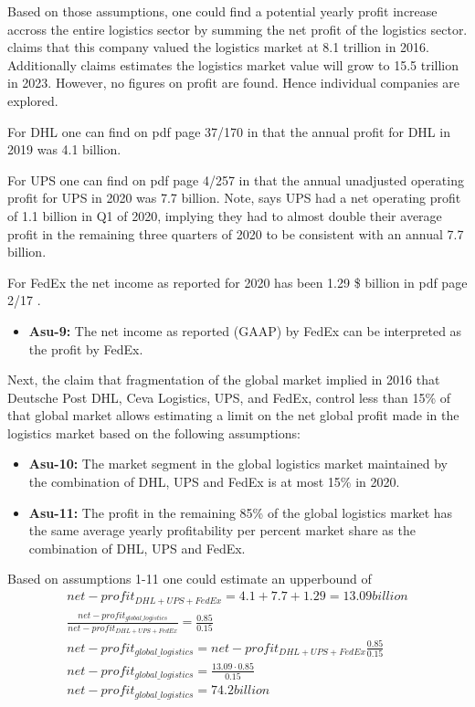 Based on those assumptions, one could find a potential yearly profit increase accross the entire logistics sector by summing the net profit of the logistics sector. \cite{cips} claims that this company \cite{transparency_market_research} valued the logistics market at 8.1 trillion in 2016. Additionally \cite{cips} claims \cite{transparency_market_research} estimates the logistics market value will grow to 15.5 trillion in 2023. However, no figures on profit are found. Hence individual companies are explored. 

For DHL one can find on pdf page 37/170 in \cite{dhl_2019_annual_report} that the annual profit for DHL in 2019 was 4.1 billion.

For UPS one can find on pdf page 4/257 in \cite{ups_2020_annual_report} that the annual unadjusted operating profit for UPS in 2020 was 7.7 billion. Note, \cite{ups_q21_earnings_call} says UPS had a net operating profit of 1.1 billion in Q1 of 2020, implying they had to almost double their average profit in the remaining three quarters of 2020 to be consistent with an annual 7.7 billion.

For FedEx the net income as reported for 2020 has been 1.29 \$ billion in pdf page 2/17 \cite{fedex_2020_annual_report}. 

\begin{itemize}
\item \textbf{Asu-9:} The net income as reported (GAAP) by FedEx can be interpreted as the profit by FedEx.
\end{itemize}

Next, the claim that fragmentation of the global market implied in 2016 that Deutsche Post DHL, Ceva Logistics, UPS, and FedEx, control less than 15\% of that global market allows estimating a limit on the net global profit made in the logistics market based on the following assumptions:

\begin{itemize}
	\item \textbf{Asu-10:} The market segment in the global logistics market maintained by the combination of DHL, UPS and FedEx is at most 15\% in 2020.
	\item \textbf{Asu-11:} The profit in the remaining 85\% of the global logistics market has the same average yearly profitability per percent market share as the combination of DHL, UPS and FedEx.
\end{itemize}

Based on assumptions 1-11 one could estimate an upperbound of 
\begin{equation}
	\begin{split}
		net-profit_{DHL+UPS+FedEx}=4.1+7.7+1.29=13.09 billion\\
		\frac{net-profit_{global\_logistics}}{net-profit_{DHL+UPS+FedEx}}=\frac{0.85}{0.15}\\
		net-profit_{global\_logistics}=net-profit_{DHL+UPS+FedEx}\frac{0.85}{0.15}\\
		net-profit_{global\_logistics}=\frac{13.09\cdot0.85}{0.15}\\
		net-profit_{global\_logistics}=74.2 billion
	\end{split}
\end{equation}

